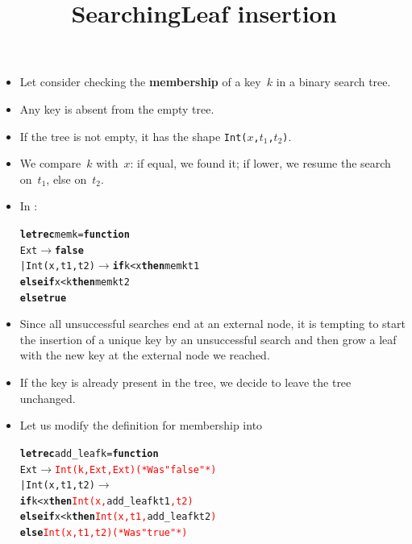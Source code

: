 \documentclass[wide]{slides}
\begin{document}
\begin{slide}
  \title{Searching}

  \begin{itemize}

    \item Let consider checking the \textbf{membership} of a key~\(k\)
      in a binary search tree.

    \item Any key is absent from the empty tree.

    \item If the tree is not empty, it has the shape
      \texttt{Int($x$,$t_1$,$t_2$)}.

    \item We compare~\(k\) with~\(x\): if equal, we found it; if
      lower, we resume the search on~\(t_1\), else on~\(t_2\).

    \item In \OCaml:
      \smallskip
\begin{alltt}
\textbf{let rec} mem k = \textbf{function}
  Ext \(\rightarrow\) \textbf{false}
| Int (x,t1,t2) \(\rightarrow\) \textbf{if} k < x \textbf{then} mem k t1
                       \textbf{else if} x < k \textbf{then} mem k t2
                             \textbf{else} \textbf{true}
\end{alltt}

  \end{itemize}

\end{slide}

\begin{slide}
  \title{Leaf insertion}

  \begin{itemize}

    \item Since all unsuccessful searches end at an external node, it
      is tempting to start the insertion of a unique key by an
      unsuccessful search and then grow a leaf with the new key at the
      external node we reached.

    \item If the key is already present in the tree, we decide to
      leave the tree unchanged.

    \item Let us modify the \OCaml definition for membership into
\smallskip
\begin{alltt}
\textbf{let rec} add_leaf k = \textbf{function}
  Ext \(\rightarrow\) \textcolor{red}{Int (k, Ext, Ext) (* Was "false" *)}
| Int (x,t1,t2) \(\rightarrow\)
    \textbf{if} k < x \textbf{then} \textcolor{red}{Int (x,} add_leaf k t1\textcolor{red}{, t2)}
    \textbf{else if} x < k \textbf{then} \textcolor{red}{Int (x, t1,} add_leaf k t2\textcolor{red}{)}
                    \textbf{else} \textcolor{red}{Int (x,t1,t2) (* Was "true" *)}
\end{alltt}

  \end{itemize}

\end{slide}
\end{document}
